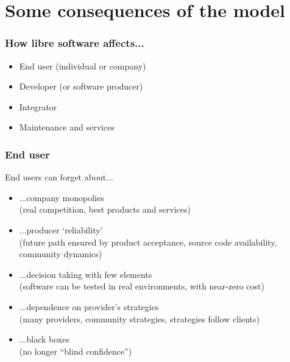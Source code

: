 
\section{Some consequences of the model}


\begin{frame}
\frametitle{How libre software affects...}

\begin{itemize}
\item End user (individual or company)
\item Developer (or software producer)
\item Integrator
\item Maintenance and services
\end{itemize}
\end{frame}



\begin{frame}
\frametitle{End user}

End users can forget about...

\begin{itemize}
\item ...company monopolies \\
  (real competition, best products and services)
\item ...producer `reliability' \\
  (future path ensured by product acceptance, source code availability, community dynamics)
\item ...decision taking with few elements \\
  (software can be tested in real environments, with near-zero cost)
\item ...dependence on provider's strategies \\
  (many providers, community strategies, strategies follow clients)
\item ...black boxes \\
  (no longer ``blind confidence'')
\end{itemize}
\end{frame}


